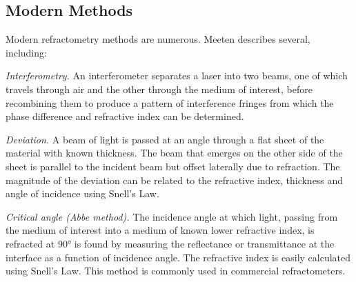 \documentclass[
    aps,
    prl,
    reprint,
    10pt,
    amsmath,
    amssymb,
    a4paper,
    longbibliography
]{revtex4-2}
\begin{document}
\subsection{Modern Methods}
Modern refractometry methods are numerous. Meeten
\cite{meeten_measurement} describes several, including:

\emph{Interferometry.} An interferometer separates a laser into two beams,
one of which travels through air and the other through the medium of
interest, before recombining them to produce a pattern of interference
fringes from which the phase difference and refractive index can be
determined.

\emph{Deviation.} A beam of light is passed at an angle through a flat
sheet of the material with known thickness. The beam that emerges on the
other side of the sheet is parallel to the incident beam but offset
laterally due to refraction. The magnitude of the deviation can be
related to the refractive index, thickness and angle of incidence using
Snell's Law.

\emph{Critical angle (Abbe method).} The incidence angle at which light,
passing from the medium of interest into a medium of known lower
refractive index, is refracted at $\ang{90}$ is found by measuring the
reflectance or transmittance at the interface as a function of
incidence angle. The refractive index is easily calculated using Snell's
Law. This method is commonly used in commercial refractometers.
\end{document}
